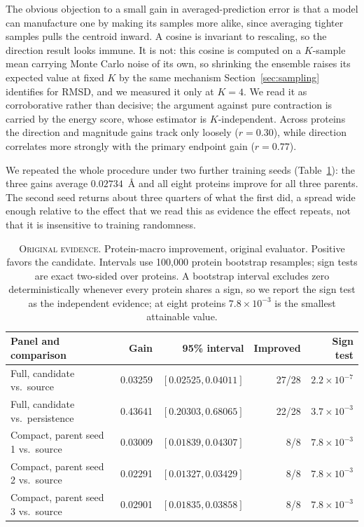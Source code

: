 \documentclass{article}
\begin{document}
The obvious objection to a small gain in averaged-prediction error is that a model can manufacture one by making its samples more alike, since averaging tighter samples pulls the centroid inward. A cosine is invariant to rescaling, so the direction result looks immune. It is not: this cosine is computed on a $K$-sample mean carrying Monte Carlo noise of its own, so shrinking the ensemble raises its expected value at fixed $K$ by the same mechanism Section~\ref{sec:sampling} identifies for RMSD, and we measured it only at $K=4$. We read it as corroborative rather than decisive; the argument against pure contraction is carried by the energy score, whose estimator is $K$-independent. Across proteins the direction and magnitude gains track only loosely ($r=0.30$), while direction correlates more strongly with the primary endpoint gain ($r=0.77$).

We repeated the whole procedure under two further training seeds (Table~\ref{tab:endpoint}): the three gains average $0.02734$~\AA{} and all eight proteins improve for all three parents. The second seed returns about three quarters of what the first did, a spread wide enough relative to the effect that we read this as evidence the effect repeats, not that it is insensitive to training randomness.

\begin{table}[tb]
\centering
\caption{\textsc{Original evidence.} Protein-macro improvement, original evaluator. Positive favors the candidate. Intervals use 100{,}000 protein bootstrap resamples; sign tests are exact two-sided over proteins. A bootstrap interval excludes zero deterministically whenever every protein shares a sign, so we report the sign test as the independent evidence; at eight proteins $7.8\times10^{-3}$ is the smallest attainable value.}
\label{tab:endpoint}
\scriptsize
\begin{tabular}{lrrrr}
\toprule
Panel and comparison & Gain & 95\% interval & Improved & Sign test \\
\midrule
Full, candidate vs.\ source        & 0.03259 & $[0.02525, 0.04011]$ & 27/28 & $2.2\times10^{-7}$ \\
Full, candidate vs.\ persistence   & 0.43641 & $[0.20303, 0.68065]$ & 22/28 & $3.7\times10^{-3}$ \\
Compact, parent seed 1 vs.\ source & 0.03009 & $[0.01839, 0.04307]$ & 8/8 & $7.8\times10^{-3}$ \\
Compact, parent seed 2 vs.\ source & 0.02291 & $[0.01327, 0.03429]$ & 8/8 & $7.8\times10^{-3}$ \\
Compact, parent seed 3 vs.\ source & 0.02901 & $[0.01835, 0.03858]$ & 8/8 & $7.8\times10^{-3}$ \\
\bottomrule
\end{tabular}
\end{table}
\end{document}
